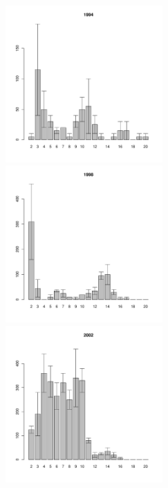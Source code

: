 \documentclass[12pt, a4paper]{article}
\begin{document}
\newpage \begin{figure}[h] 

\begin{multicols}{3}
\hfill
\includegraphics[width=60mm]{../White_Sea/Ryashkov_ZRS/zrs2_1994_.pdf}
\hfill
\includegraphics[width=60mm]{../White_Sea/Ryashkov_ZRS/zrs2_1998_.pdf}
\hfill
\includegraphics[width=60mm]{../White_Sea/Ryashkov_ZRS/zrs2_2002_.pdf}
\end{multicols}




\end{figure}
\end{document}
